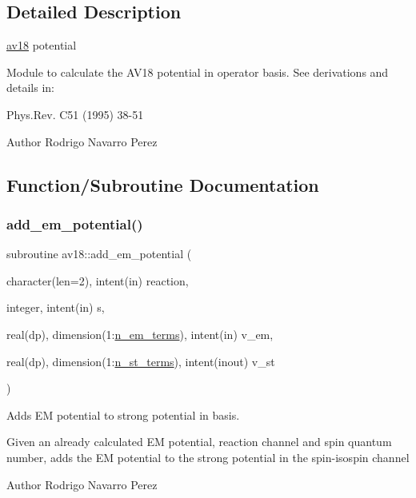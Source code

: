 \subsection{Detailed Description}
\hyperlink{namespaceav18}{av18} potential 

Module to calculate the A\+V18 potential in operator basis. See derivations and details in\+:

Phys.\+Rev. C51 (1995) 38-\/51

\begin{DoxyAuthor}{Author}
Rodrigo Navarro Perez 
\end{DoxyAuthor}


\subsection{Function/\+Subroutine Documentation}
\mbox{\label{namespaceav18_ac263bd481e6a61fd5eaae23d97dce143}} 
\subsubsection{\texorpdfstring{add\+\_\+em\+\_\+potential()}{add\_em\_potential()}}
{\footnotesize\ttfamily subroutine av18\+::add\+\_\+em\+\_\+potential (\begin{DoxyParamCaption}\item[{character(len=2), intent(in)}]{reaction,  }\item[{integer, intent(in)}]{s,  }\item[{real(dp), dimension(1\+:\hyperlink{namespaceav18_abdf1bd7208851f82a6773c558de0602f}{n\+\_\+em\+\_\+terms}), intent(in)}]{v\+\_\+em,  }\item[{real(dp), dimension(1\+:\hyperlink{namespaceav18_ae95361ff4578323939542bc0807d127d}{n\+\_\+st\+\_\+terms}), intent(inout)}]{v\+\_\+st }\end{DoxyParamCaption})\hspace{0.3cm}{\ttfamily [private]}}



Adds EM potential to strong potential in basis. 

Given an already calculated EM potential, reaction channel and spin quantum number, adds the EM potential to the strong potential in the spin-\/isospin channel

\begin{DoxyAuthor}{Author}
Rodrigo Navarro Perez
\end{DoxyAuthor}

